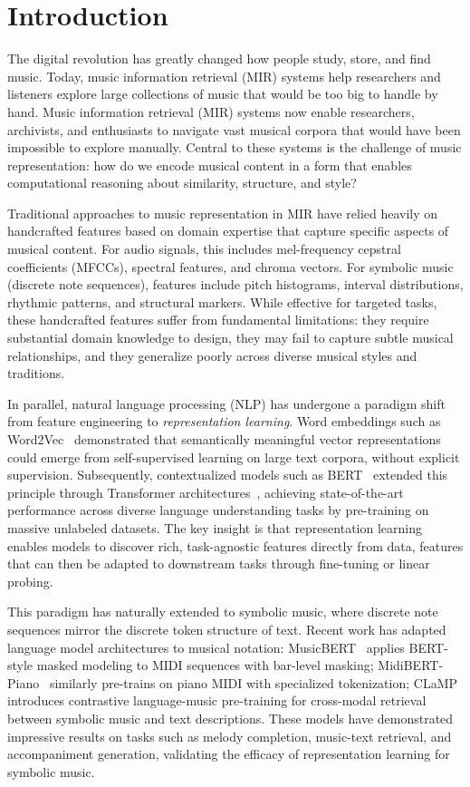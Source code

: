 \documentclass[]{interact}
\theoremstyle{plain}
\theoremstyle{definition}
\theoremstyle{remark}
\begin{document}
\section{Introduction}

The digital revolution has greatly changed how people study, store, and find music. Today, music information retrieval (MIR) systems help researchers and listeners explore large collections of music that would be too big to handle by hand. Music information retrieval (MIR) systems now enable researchers, archivists, and enthusiasts to navigate vast musical corpora that would have been impossible to explore manually. Central to these systems is the challenge of music representation: how do we encode musical content in a form that enables computational reasoning about similarity, structure, and style?

Traditional approaches to music representation in MIR have relied heavily on handcrafted features based on domain expertise that capture specific aspects of musical content. For audio signals, this includes mel-frequency cepstral coefficients (MFCCs), spectral features, and chroma vectors. For symbolic music (discrete note sequences), features include pitch histograms, interval distributions, rhythmic patterns, and structural markers. While effective for targeted tasks, these handcrafted features suffer from fundamental limitations: they require substantial domain knowledge to design, they may fail to capture subtle musical relationships, and they generalize poorly across diverse musical styles and traditions.

In parallel, natural language processing (NLP) has undergone a paradigm shift from feature engineering to \textit{representation learning}. Word embeddings such as Word2Vec~\cite{Word2Vec2013} demonstrated that semantically meaningful vector representations could emerge from self-supervised learning on large text corpora, without explicit supervision. Subsequently, contextualized models such as BERT~\cite{BERT2019} extended this principle through Transformer architectures~\cite{Transformer2017}, achieving state-of-the-art performance across diverse language understanding tasks by pre-training on massive unlabeled datasets. The key insight is that representation learning enables models to discover rich, task-agnostic features directly from data, features that can then be adapted to downstream tasks through fine-tuning or linear probing.

This paradigm has naturally extended to symbolic music, where discrete note sequences mirror the discrete token structure of text. Recent work has adapted language model architectures to musical notation: MusicBERT~\cite{MusicBERT2022} applies BERT-style masked modeling to MIDI sequences with bar-level masking; MidiBERT-Piano~\cite{MidiBERT2021} similarly pre-trains on piano MIDI with specialized tokenization; CLaMP~\cite{CLaMP2023} introduces contrastive language-music pre-training for cross-modal retrieval between symbolic music and text descriptions. These models have demonstrated impressive results on tasks such as melody completion, music-text retrieval, and accompaniment generation, validating the efficacy of representation learning for symbolic music.
\end{document}
